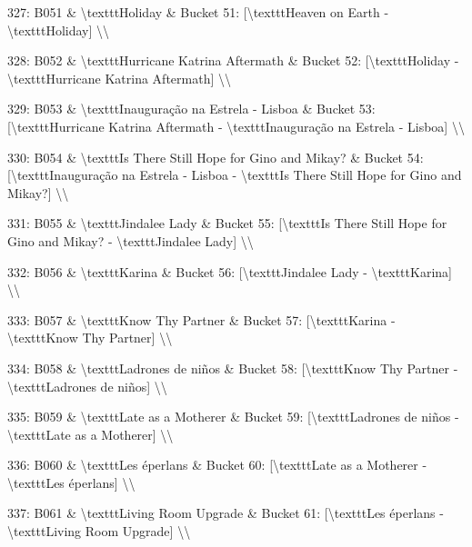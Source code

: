 \documentclass[11pt,a4paper]{article}
\begin{document}
{327: B051 \& \textbackslash{}texttt{Holiday} \& Bucket 51: [\textbackslash{}texttt{Heaven on Earth} - \textbackslash{}texttt{Holiday}] \textbackslash{}\textbackslash{}

328: B052 \& \textbackslash{}texttt{Hurricane Katrina Aftermath} \& Bucket 52: [\textbackslash{}texttt{Holiday} - \textbackslash{}texttt{Hurricane Katrina Aftermath}] \textbackslash{}\textbackslash{}

329: B053 \& \textbackslash{}texttt{Inauguração na Estrela - Lisboa} \& Bucket 53: [\textbackslash{}texttt{Hurricane Katrina Aftermath} - \textbackslash{}texttt{Inauguração na Estrela - Lisboa}] \textbackslash{}\textbackslash{}

330: B054 \& \textbackslash{}texttt{Is There Still Hope for Gino and Mikay?} \& Bucket 54: [\textbackslash{}texttt{Inauguração na Estrela - Lisboa} - \textbackslash{}texttt{Is There Still Hope for Gino and Mikay?}] \textbackslash{}\textbackslash{}

331: B055 \& \textbackslash{}texttt{Jindalee Lady} \& Bucket 55: [\textbackslash{}texttt{Is There Still Hope for Gino and Mikay?} - \textbackslash{}texttt{Jindalee Lady}] \textbackslash{}\textbackslash{}

332: B056 \& \textbackslash{}texttt{Karina} \& Bucket 56: [\textbackslash{}texttt{Jindalee Lady} - \textbackslash{}texttt{Karina}] \textbackslash{}\textbackslash{}

333: B057 \& \textbackslash{}texttt{Know Thy Partner} \& Bucket 57: [\textbackslash{}texttt{Karina} - \textbackslash{}texttt{Know Thy Partner}] \textbackslash{}\textbackslash{}

334: B058 \& \textbackslash{}texttt{Ladrones de niños} \& Bucket 58: [\textbackslash{}texttt{Know Thy Partner} - \textbackslash{}texttt{Ladrones de niños}] \textbackslash{}\textbackslash{}

335: B059 \& \textbackslash{}texttt{Late as a Mother\textbf{}er} \& Bucket 59: [\textbackslash{}texttt{Ladrones de niños} - \textbackslash{}texttt{Late as a Mother\textbf{}er}] \textbackslash{}\textbackslash{}

336: B060 \& \textbackslash{}texttt{Les éperlans} \& Bucket 60: [\textbackslash{}texttt{Late as a Mother\textbf{}er} - \textbackslash{}texttt{Les éperlans}] \textbackslash{}\textbackslash{}

337: B061 \& \textbackslash{}texttt{Living Room Upgrade} \& Bucket 61: [\textbackslash{}texttt{Les éperlans} - \textbackslash{}texttt{Living Room Upgrade}] \textbackslash{}\textbackslash{}

}
\end{document}
